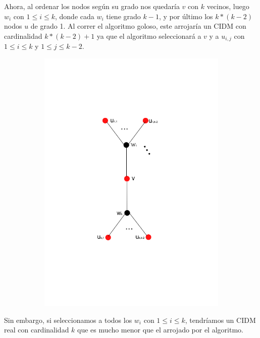  Ahora, al ordenar los nodos según su grado nos quedaría $v$ con $k$ vecinos, luego $w_i$ con $1 \leq i \leq k$, donde cada $w_i$ tiene grado $k-1$, y por último los $k * (k-2)$ nodos $u$ de grado 1. Al correr el algoritmo goloso, este arrojaría un CIDM con cardinalidad $k * (k-2) + 1$ ya que el algoritmo seleccionará a $v$ y a $u_{i,j}$ con $1 \leq i \leq k$ y $1 \leq j \leq k-2$. \\

\begin{figure}[H]
\centering
\begin{subfigure}[b]{0.5\textwidth}
                \includegraphics[width=\textwidth]{imagenes/grafos-ej3-tp3-2.png}
                \caption{}
        \end{subfigure}%
\end{figure}


 Sin embargo, si seleccionamos a todos los  $w_i$ con $1 \leq i \leq k$, tendríamos un CIDM real con cardinalidad $k$ que es mucho menor que el arrojado por el algoritmo.

